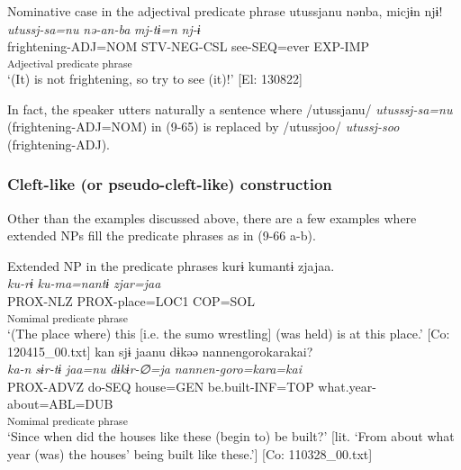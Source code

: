 \ea   Nominative case in the adjectival predicate phrase \label{ex:9.65}
 \gllll  utussjanu  nənba,  micjɨn  njɨ!\\
    \textit{utussj-sa=nu}  \textit{nə-an-ba}  \textit{mj-tɨ=n}  \textit{nj-ɨ}\\
    frightening-ADJ=NOM  STV-NEG-CSL  see-SEQ=ever  EXP-IMP\\
    [Adjective  Stative verb]\textsubscript{Adjectival predicate phrase}    \\
    \glt     ‘(It) is not frightening, so try to see (it)!’ [El: 130822]
\z

In fact, the speaker utters naturally a sentence where /utussjanu/ \textit{utusssj-sa=nu} (frightening-ADJ=NOM) in (9-65) is replaced by /utussjoo/ \textit{utussj-soo} (frightening-ADJ).

\subsubsection{Cleft-like (or pseudo-cleft-like) construction}\label{sec:9.3.3.2}

Other than the examples discussed above, there are a few examples where extended NPs fill the predicate phrases as in (9-66 a-b).

\ea   Extended NP in the predicate phrases \label{ex:9.66}
\ea %
 \gllll  kurɨ  kumantɨ  zjajaa.\\
      \textit{ku-rɨ}  \textit{ku-ma=nantɨ}  \textit{zjar=jaa}\\
      PROX-NLZ  PROX-place=LOC1  COP=SOL\\
        [Extended NP  Copula verb]\textsubscript{Nomimal predicate phrase}\\
      \glt       ‘(The place where) this [i.e. the sumo wrestling] (was held) is at this place.’ [Co: 120415\_00.txt]
\ex %
  \glll kan  sjɨ  jaanu  dɨkəə    {\textbar}nannengoro{\textbar}karakai?\\
      \textit{ka-n}  \textit{sɨr-tɨ}  \textit{jaa=nu}  \textit{dɨkɨr-∅=ja} \textit{nannen-goro=kara=kai}\\                                                                           
      PROX-ADVZ  do-SEQ  house=GEN  be.built-INF=TOP                       what.year-about=ABL=DUB\\                                                                           
                                                                           [Extended NP]\textsubscript{Nomimal predicate phrase}\\
      \glt ‘Since when did the houses like these (begin to) be built?’ [lit. ‘From about what year (was) the houses’ being built like these.’]   [Co: 110328\_00.txt]
    \z
\z

